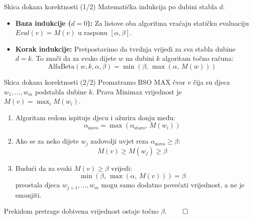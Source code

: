 \documentclass[aspectratio=43]{beamer}
\begin{document}
\begin{frame}{Skica dokaza korektnosti (1/2)}
	Matematička indukcija po dubini stabla $d$:
	
	\begin{itemize}
		\item \textbf{Baza indukcije ($d = 0$):} 
		Za listove oba algoritma vraćaju statičku evaluaciju $Eval(v) = M(v)$ u rasponu $[\alpha, \beta]$.
		
		\pause
		\vspace{0.4cm}
		\item \textbf{Korak indukcije:} 
		Pretpostavimo da tvrdnja vrijedi za sva stabla dubine $d = k$. To znači da za svako dijete $w$ na dubini $k$ algoritam točno računa:
		\[
		\text{AlfaBeta}(w, k, \alpha, \beta) = \min(\beta, \, \max(\alpha, \, M(w)))
		\]
	\end{itemize}
\end{frame}

\begin{frame}{Skica dokaza korektnosti (2/2)}
	Promatramo BSO MAX čvor $v$ čija su djeca $w_1, \dots, w_m$ podstabla dubine $k$. Prava Minimax vrijednost je $M(v) = \max_i M(w_i)$.
	
	\pause
	\vspace{0.2cm}
	\begin{enumerate}
		\item Algoritam redom ispituje djecu i ažurira donju među:
		\[
		\alpha_{\text{novo}} = \max(\alpha_{\text{staro}}, \, M(w_i))
		\]
		\pause
		\item Ako se za neko dijete $w_j$ zadovolji uvjet reza $\alpha_{\text{novo}} \ge \beta$:
		\[
		M(v) \ge M(w_j) \ge \beta
		\]
		\pause
		\item Budući da za svaki $M(v) \ge \beta$ vrijedi:
		\[
		\min(\beta, \, \max(\alpha, \, M(v))) = \beta
		\]
		preostala djeca $w_{j+1}, \dots, w_m$ mogu samo dodatno povećati vrijednost, a ne je smanjiti.
	\end{enumerate}
	
	\pause
	\vspace{0.2cm}
	Prekidom pretrage dobivena vrijednost ostaje točno $\beta$. $\qed$
\end{frame}
\end{document}
